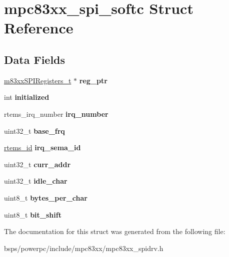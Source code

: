 \hypertarget{structmpc83xx__spi__softc}{}\section{mpc83xx\+\_\+spi\+\_\+softc Struct Reference}
\label{structmpc83xx__spi__softc}
\subsection*{Data Fields}
\begin{DoxyCompactItemize}
\item 
\mbox{\label{structmpc83xx__spi__softc_a351382fd8a3e6d443f0f377d6704a9db}} 
\mbox{\hyperlink{structm83xxSPIRegisters__}{m83xx\+S\+P\+I\+Registers\+\_\+t}} $\ast$ {\bfseries reg\+\_\+ptr}
\item 
\mbox{\label{structmpc83xx__spi__softc_a50695ca8a6f6a07ff0d718348c9f5518}} 
int {\bfseries initialized}
\item 
\mbox{\label{structmpc83xx__spi__softc_a7de085c6db4db8df6b8aa129e2a6ccf0}} 
rtems\+\_\+irq\+\_\+number {\bfseries irq\+\_\+number}
\item 
\mbox{\label{structmpc83xx__spi__softc_a7bcc24e7aafb290a079dc6fb2ac61828}} 
uint32\+\_\+t {\bfseries base\+\_\+frq}
\item 
\mbox{\label{structmpc83xx__spi__softc_ac65babcb46f042eefd35ac2b832560d1}} 
\mbox{\hyperlink{group__ClassicTasks_gab20892b814dced7dd4e5b9bf42becd57}{rtems\+\_\+id}} {\bfseries irq\+\_\+sema\+\_\+id}
\item 
\mbox{\label{structmpc83xx__spi__softc_a05452017ea3ab996086d5c53b7249735}} 
uint32\+\_\+t {\bfseries curr\+\_\+addr}
\item 
\mbox{\label{structmpc83xx__spi__softc_a89c79361e00885e89a8ab33d06d8f5bf}} 
uint32\+\_\+t {\bfseries idle\+\_\+char}
\item 
\mbox{\label{structmpc83xx__spi__softc_ae1174118b87bd608c71e05fa27a710b2}} 
uint8\+\_\+t {\bfseries bytes\+\_\+per\+\_\+char}
\item 
\mbox{\label{structmpc83xx__spi__softc_a2ca864602020290f45cb8d814c5fbd71}} 
uint8\+\_\+t {\bfseries bit\+\_\+shift}
\end{DoxyCompactItemize}


The documentation for this struct was generated from the following file\+:\begin{DoxyCompactItemize}
\item 
bsps/powerpc/include/mpc83xx/mpc83xx\+\_\+spidrv.\+h\end{DoxyCompactItemize}
